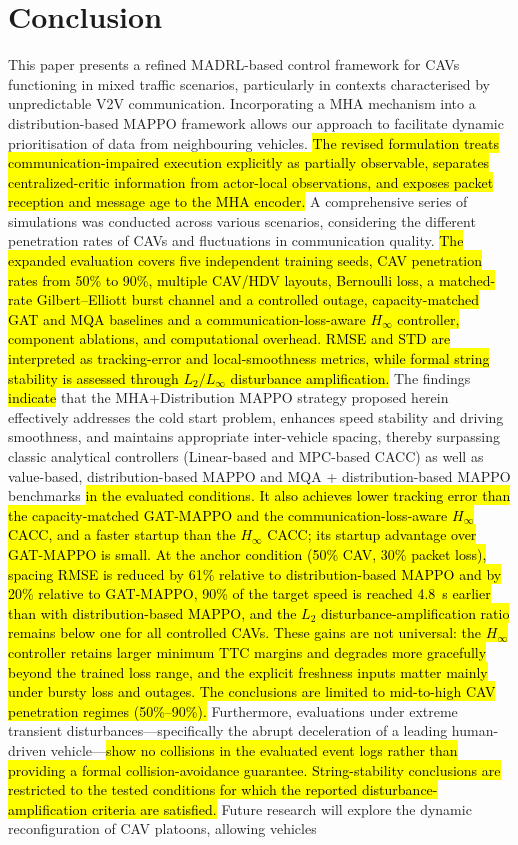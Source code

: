 \documentclass{ieeeaccess}
\begin{document}
\section{Conclusion}
\label{sec:Conclusion}
This paper presents a refined MADRL-based control framework for CAVs functioning in mixed traffic scenarios, particularly in contexts characterised by unpredictable V2V communication. Incorporating a MHA mechanism into a distribution-based MAPPO framework allows our approach to facilitate dynamic prioritisation of data from neighbouring vehicles. \hl{The revised formulation treats communication-impaired execution explicitly as partially observable, separates centralized-critic information from actor-local observations, and exposes packet reception and message age to the MHA encoder.} A comprehensive series of simulations was conducted across various scenarios, considering the different penetration rates of CAVs and fluctuations in communication quality. \hl{The expanded evaluation covers five independent training seeds, CAV penetration rates from 50\% to 90\%, multiple CAV/HDV layouts, Bernoulli loss, a matched-rate Gilbert--Elliott burst channel and a controlled outage, capacity-matched GAT and MQA baselines and a communication-loss-aware $H_\infty$ controller, component ablations, and computational overhead. RMSE and STD are interpreted as tracking-error and local-smoothness metrics, while formal string stability is assessed through $L_2/L_\infty$ disturbance amplification.} The findings \hl{indicate} that the MHA+Distribution MAPPO strategy proposed herein effectively addresses the cold start problem, enhances speed stability and driving smoothness, and maintains appropriate inter-vehicle spacing, thereby surpassing classic analytical controllers (Linear-based and MPC-based CACC) as well as value-based, distribution-based MAPPO and MQA + distribution-based MAPPO benchmarks \hl{in the evaluated conditions. It also achieves lower tracking error than the capacity-matched GAT-MAPPO and the communication-loss-aware $H_\infty$ CACC, and a faster startup than the $H_\infty$ CACC; its startup advantage over GAT-MAPPO is small. At the anchor condition (50\% CAV, 30\% packet loss), spacing RMSE is reduced by 61\% relative to distribution-based MAPPO and by 20\% relative to GAT-MAPPO, 90\% of the target speed is reached 4.8~s earlier than with distribution-based MAPPO, and the $L_2$ disturbance-amplification ratio remains below one for all controlled CAVs. These gains are not universal: the $H_\infty$ controller retains larger minimum TTC margins and degrades more gracefully beyond the trained loss range, and the explicit freshness inputs matter mainly under bursty loss and outages. The conclusions are limited to mid-to-high CAV penetration regimes (50\%--90\%).} Furthermore, evaluations under extreme transient disturbances—specifically the abrupt deceleration of a leading human-driven vehicle—\hl{show no collisions in the evaluated event logs rather than providing a formal collision-avoidance guarantee. String-stability conclusions are restricted to the tested conditions for which the reported disturbance-amplification criteria are satisfied.} Future research will explore the dynamic reconfiguration of CAV platoons, allowing vehicles 
\end{document}
